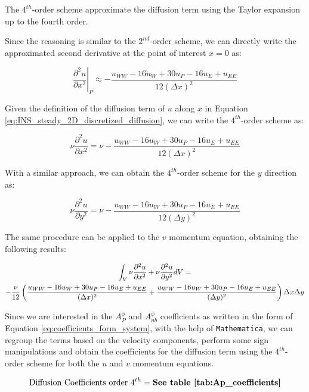 The $4^{th}$-order scheme approximate the diffusion term using the Taylor expansion up to the fourth order.

Since the reasoning is similar to the $2^{nd}$-order scheme, we can directly write the approximated second derivative at the point of interest $x = 0$ as:

\begin{equation}
    \left. \frac{\partial^2 u}{\partial x^2} \right|_P \approx -\frac{u_{WW} - 16 u_{W} + 30 u_{P} - 16 u_{E} + u_{EE}}{12 (\Delta x)^2}
\end{equation}

Given the definition of the diffusion term of $u$ along $x$ in Equation \ref{eq:INS_steady_2D_discretized_diffusion}, we can write the $4^{th}$-order scheme as:

\begin{equation}
    \nu \frac{\partial^2 u}{\partial x^2} = \nu -\frac{u_{WW} - 16 u_{W} + 30 u_{P} - 16 u_{E} + u_{EE}}{12 (\Delta x)^2}
\end{equation}

With a similar approach, we can obtain the $4^{th}$-order scheme for the $y$ direction as:

\begin{equation}
    \nu \frac{\partial^2 u}{\partial y^2} = \nu -\frac{u_{WW} - 16 u_{W} + 30 u_{P} - 16 u_{E} + u_{EE}}{12 (\Delta y)^2}
\end{equation}

The same procedure can be applied to the $v$ momentum equation, obtaining the following results:

\begin{gather}
    \int_{V} \nu \frac{\partial^2 u}{\partial x^2} + \nu \frac{\partial^2 u}{\partial y^2} \space dV = \\
    -\frac{\nu}{12}  \left(\frac{u_{WW} - 16 u_{W} + 30 u_{P} - 16 u_{E} + u_{EE}}{(\Delta x)^2} + \frac{u_{WW} - 16 u_{W} + 30 u_{P} - 16 u_{E} + u_{EE}}{(\Delta y)^2} \right) \Delta x \Delta y
\end{gather}

Since we are interested in the $A_P^\phi$ and $A_{nb}^\phi$ coefficients as written in the form of Equation \ref{eq:coefficients_form_system}, with the help of \texttt{Mathematica}, we can regroup the terms based on the velocity components, perform some sign manipulations and obtain the coefficients for the diffusion term using the $4^{th}$-order scheme for both the $u$ and $v$ momentum equations.

\begin{equation}
    \text{Diffusion Coefficients order } 4^{th} = { \textbf{See table \ref{tab:Ap_coefficients}} }
\end{equation}
